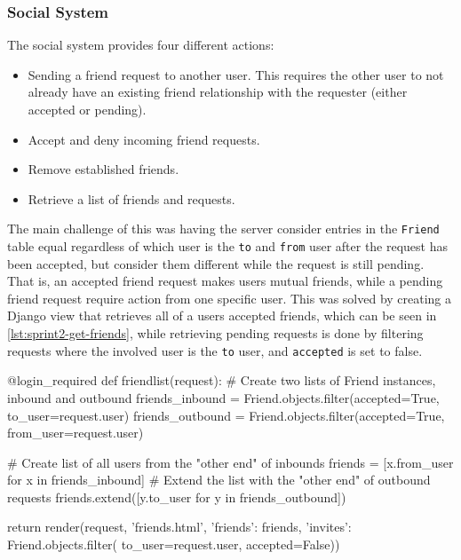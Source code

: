 \subsubsection{Social System} 
The social system provides four different actions:
	\begin{itemize}
		\item{Sending a friend request to another user. This requires the other user to not already have an existing friend relationship with the requester (either accepted or pending).}
		\item{Accept and deny incoming friend requests.}
		\item{Remove established friends.}
		\item{Retrieve a list of friends and requests.}
		\end{itemize}
	The main challenge of this was having the server consider entries in the \texttt{Friend} table equal regardless of which user is the \texttt{to} and \texttt{from} user after the request has been accepted, but consider them different while the request is still pending. That is, an accepted friend request makes users mutual friends, while a pending friend request require action from one specific user. This was solved by creating a Django view that retrieves all of a users accepted friends, which can be seen in \autoref{lst:sprint2-get-friends}, while retrieving pending requests is done by filtering requests where the involved user is the \texttt{to} user, and \texttt{accepted} is set to false.


\begin{code}[label={lst:sprint2-get-friends}, caption={Retrieve Friends and Pending Invitations}, language={Python}, style={PythonDoc}]
@login_required
def friendlist(request):
	# Create two lists of Friend instances, inbound and outbound 
	friends_inbound = Friend.objects.filter(accepted=True,
	                                        to_user=request.user)
	friends_outbound = Friend.objects.filter(accepted=True,
	                                         from_user=request.user)
	
	# Create list of all users from the "other end" of inbounds
	friends = [x.from_user for x in friends_inbound]
	# Extend the list with the "other end" of outbound requests
	friends.extend([y.to_user for y in friends_outbound])
	
	return render(request,
	              'friends.html',
	              {'friends': friends,
				   'invites': Friend.objects.filter(
				       to_user=request.user, 
				       accepted=False)})
\end{code}

